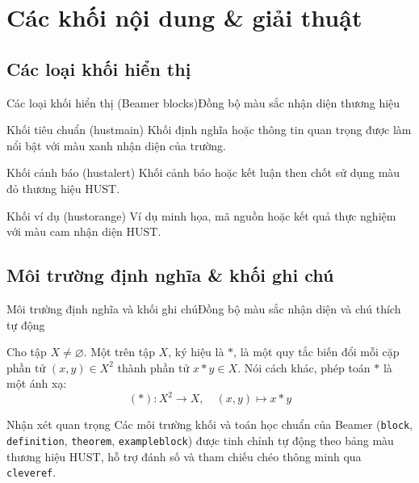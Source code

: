 \documentclass[aspectratio=169,10pt]{beamer}
\begin{document}
\section[Giải thuật]{Các khối nội dung \& giải thuật}
\subsection{Các loại khối hiển thị}
\begin{frame}{Các loại khối hiển thị (Beamer blocks)}{Đồng bộ màu sắc nhận diện thương hiệu}
  \begin{block}{Khối tiêu chuẩn (hustmain)}
    Khối định nghĩa hoặc thông tin quan trọng được làm nổi bật với màu xanh nhận diện của trường.
  \end{block}

  \begin{alertblock}{Khối cảnh báo (hustalert)}
    Khối cảnh báo hoặc kết luận then chốt sử dụng màu đỏ thương hiệu HUST.
  \end{alertblock}

  \begin{exampleblock}{Khối ví dụ (hustorange)}
    Ví dụ minh họa, mã nguồn hoặc kết quả thực nghiệm với màu cam nhận diện HUST.
  \end{exampleblock}
\end{frame}

\subsection{Môi trường định nghĩa \& khối ghi chú}
\begin{frame}{Môi trường định nghĩa và khối ghi chú}{Đồng bộ màu sắc nhận diện và chú thích tự động}
  \begin{definition}
    Cho tập $X \neq \varnothing$. Một  trên tập $X$, ký hiệu là $*$, là một quy tắc biến đổi mỗi cặp phần tử $(x, y) \in X^2$ thành phần tử $x * y \in X$. Nói cách khác, phép toán $*$ là một ánh xạ:
    \[
      (*) : X^2 \longrightarrow X, \quad (x, y) \longmapsto x * y
    \]
  \end{definition}

  \begin{exampleblock}{Nhận xét quan trọng}
    \warning Các môi trường khối và toán học chuẩn của Beamer (\texttt{block}, \texttt{definition}, \texttt{theorem}, \texttt{exampleblock}) được tinh chỉnh tự động theo bảng màu thương hiệu HUST, hỗ trợ đánh số và tham chiếu chéo thông minh qua \texttt{cleveref}.
  \end{exampleblock}
\end{frame}
\end{document}
